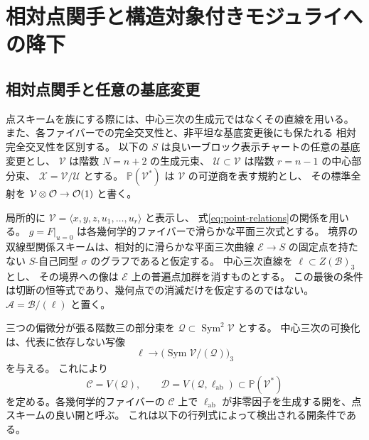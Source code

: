 \section{相対点関手と構造対象付きモジュライへの降下}
\label{sec:relative-points}

\subsection{相対点関手と任意の基底変更}
\label{subsec:relative-points}

点スキームを族にする際には、中心三次の生成元ではなくその直線を用いる。
また、各ファイバーでの完全交叉性と、非平坦な基底変更後にも保たれる
相対完全交叉性を区別する。
以下の $S$ は良い一ブロック表示チャートの任意の基底変更とし、
$\mathcal V$ は階数 $N=n+2$ の生成元束、
$\mathcal U\subset\mathcal V$ は階数 $r=n-1$ の中心部分束、
$\mathcal X=\mathcal V/\mathcal U$ とする。
$\mathbb P(\mathcal V^*)$ は $\mathcal V$ の可逆商を表す規約とし、
その標準全射を $\mathcal V\otimes\mathcal O\to\mathcal O(1)$ と書く。

局所的に $\mathcal V=\langle x,y,z,u_1,\ldots,u_r\rangle$ と表示し、
式\eqref{eq:point-relations}の関係を用いる。
$g=F|_{u=0}$ は各幾何学的ファイバーで滑らかな平面三次式とする。
境界の双線型関係スキームは、相対的に滑らかな平面三次曲線
$\mathcal E\to S$ の固定点を持たない $S$-自己同型
$\sigma$ のグラフであると仮定する。
中心三次直線を $\ell\subset Z(\mathcal B)_3$ とし、
その境界への像は $\mathcal E$ 上の普遍点加群を消すものとする。
この最後の条件は切断の恒等式であり、幾何点での消滅だけを仮定するのではない。
$\mathcal A=\mathcal B/(\ell)$ と置く。

三つの偏微分が張る階数三の部分束を
$\mathcal Q\subset\operatorname{Sym}^2\mathcal V$ とする。
中心三次の可換化は、代表に依存しない写像
\[
 \ell\longrightarrow
 \bigl(\operatorname{Sym}\mathcal V/(\mathcal Q)\bigr)_3
\]
を与える。
これにより
\[
 \mathcal C=V(\mathcal Q),\qquad
 \mathcal D=V(\mathcal Q,\ell_{\mathrm{ab}})
 \subset\mathbb P(\mathcal V^*)
\]
を定める。各幾何学的ファイバーの $\mathcal C$ 上で
$\ell_{\mathrm{ab}}$ が非零因子を生成する開を、点スキームの良い開と呼ぶ。
これは以下の行列式によって検出される開条件である。

